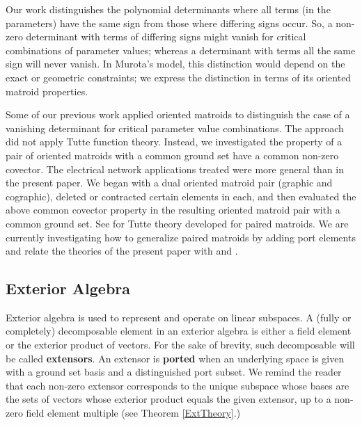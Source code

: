 \documentclass[12pt]{article}
\theoremstyle{definition}
\begin{document}
Our work
distinguishes the polynomial determinants where all terms 
(in the parameters) have the same sign from those
where differing signs occur.  So, a non-zero determinant with
terms of differing signs might vanish for critical combinations
of parameter values; whereas a determinant with terms all the same
sign will never vanish.  In Murota's model, this distinction 
would depend on the exact or geometric constraints; we express the 
distinction in terms of its oriented matroid properties.  

Some of our previous work \cite{sdcOMP} 
applied oriented matroids to distinguish the case of
a vanishing determinant for critical parameter value 
combinations.  The approach did not apply Tutte function
theory.  Instead, we investigated the property of
a pair of oriented matroids with a common ground set
have a common non-zero covector.  The electrical network
applications treated were more general than in the 
present paper.  We began with a dual oriented 
matroid pair (graphic and cographic), 
deleted or contracted certain elements in each, and then
evaluated the above common covector property in the resulting
oriented matroid pair with a common ground set.
See \cite{WelshKayibiLinking}
for Tutte theory developed for paired matroids.  We are 
currently investigating how to generalize paired matroids
by adding port elements and relate the theories 
of the present paper with \cite{sdcOMP} and
\cite{WelshKayibiLinking}.

\subsection{Exterior Algebra}

Exterior algebra is used to represent and operate on linear subspaces.
A (fully or completely) decomposable element in an exterior algebra is
either a field element or the exterior product of vectors.  For the sake of
brevity, such decomposable will be called \textbf{extensors}.  An extensor
is \textbf{ported} when an underlying space is given with a ground set basis
and a distinguished port subset.
We remind the reader that each non-zero extensor
corresponds to the unique subspace whose bases are the sets of vectors whose
exterior product equals the given extensor, up to a non-zero field 
element multiple (see Theorem \ref{ExtTheory}.)
\end{document}
